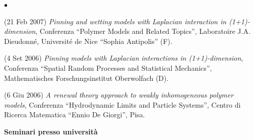 \documentclass[a4paper,11pt,oneside]{amsart}
\newenvironment{myitemize}{%
\begin{list}{$\bullet$}%
 	{%
	\setlength{\itemsep}{0.3em}%
	\setlength{\topsep}{0.3em}%
	\setlength{\partopsep}{0em}%
	\setlength{\parsep}{0em}%
	\setlength{\parskip}{0em}%
	\setlength\leftmargin{1.5em}%
	\setlength\labelwidth{1.1em}%
	\setlength{\labelsep}{0.4em}%
	}%
	}%
{\end{list}}
\renewenvironment{itemize}{
\begin{myitemize}}%
{\end{myitemize}}
\begin{document}
\begin{itemize}
\item (21 Feb 2007)
\textit{Pinning and wetting models with Laplacian interaction in (1+1)-di\-men\-sion},
Conferenza ``Polymer Models and Related Topics'',
Laboratoire J.A. Dieudonné, Université de Nice ``Sophia Antipolis'' (F).

\item (4 Set 2006)
\textit{Pinning models with Laplacian interactions in (1+1)-dimension},
Conferenza ``Spatial Random Processes and Statistical Mechanics'',
Mathematisches Forschungsinstitut Oberwolfach (D).

\item (6 Giu 2006)
\textit{A renewal theory approach to weakly inhomogeneous polymer models},
Conferenza ``Hydrodynamic Limits and Particle Systems'',
Centro di Ricerca Matematica ``Ennio De Giorgi'', Pisa.
\end{itemize}



\medskip
{\large\sf \bfseries Seminari presso università}
\smallskip
\end{document}
